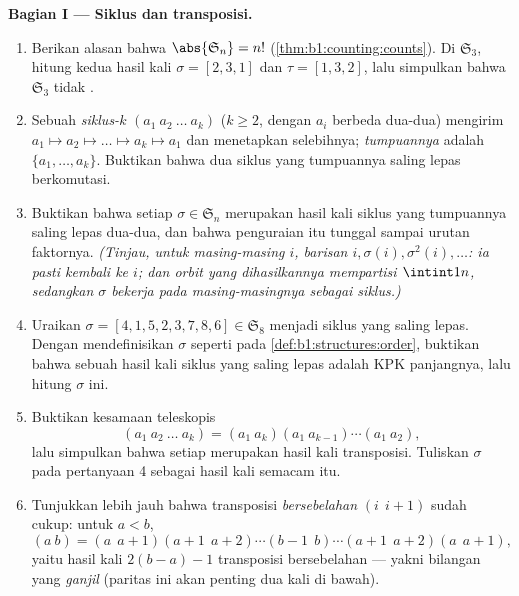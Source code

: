\begin{problem}
\medskip
\noindent\textbf{Bagian I --- Siklus dan transposisi.}
\begin{enumerate}
  \item Berikan alasan bahwa $\abs{\mathfrak S_n} = n!$
        (\cref{thm:b1:counting:counts}). Di $\mathfrak S_3$,
        hitung kedua hasil kali $\sigma = [2, 3, 1]$ dan $\tau =
        [1, 3, 2]$, lalu simpulkan bahwa $\mathfrak S_3$ tidak
        .
  \item Sebuah \emph{siklus-$k$} $(a_1\ a_2\ \dots\ a_k)$ ($k \geq 2$,
        dengan $a_i$ berbeda dua-dua) mengirim $a_1 \mapsto a_2
        \mapsto \dots \mapsto a_k \mapsto a_1$ dan menetapkan
        selebihnya; \emph{tumpuannya} adalah $\{a_1, \dots,
        a_k\}$. Buktikan bahwa dua siklus yang tumpuannya saling lepas
        berkomutasi.
  \item Buktikan bahwa setiap $\sigma \in \mathfrak S_n$ merupakan hasil kali
        siklus yang tumpuannya saling lepas dua-dua, dan bahwa
        penguraian itu tunggal sampai urutan faktornya.
        \emph{(Tinjau, untuk masing-masing $i$, barisan $i, \sigma(i),
        \sigma^2(i), \dots$: ia pasti kembali ke $i$; dan
        \emph{orbit} yang dihasilkannya mempartisi $\intint1n$, sedangkan $\sigma$ bekerja pada
        masing-masingnya sebagai siklus.)}
  \item Uraikan $\sigma = [4, 1, 5, 2, 3, 7, 8, 6] \in
        \mathfrak S_8$ menjadi siklus yang saling lepas. Dengan mendefinisikan
        \emph{} $\sigma$ seperti pada
        \cref{def:b1:structures:order}, buktikan bahwa  sebuah
        hasil kali siklus yang saling lepas adalah KPK panjangnya,
        lalu hitung  $\sigma$ ini.
  \item Buktikan kesamaan teleskopis
        \[
        (a_1\ a_2\ \dots\ a_k)
        = (a_1\ a_k)(a_1\ a_{k-1})\cdots(a_1\ a_2) ,
        \]
        lalu simpulkan bahwa setiap  merupakan hasil kali
        transposisi. Tuliskan $\sigma$ pada pertanyaan 4 sebagai hasil
        kali semacam itu.
  \item Tunjukkan lebih jauh bahwa transposisi \emph{bersebelahan}
        $(i\ \ i{+}1)$ sudah cukup: untuk $a < b$,
        \[
        (a\ b) = (a\ \ a{+}1)(a{+}1\ \ a{+}2)\cdots(b{-}1\ \ b)
        \cdots(a{+}1\ \ a{+}2)(a\ \ a{+}1),
        \]
        yaitu hasil kali $2(b - a) - 1$ transposisi bersebelahan ---
        yakni bilangan yang \emph{ganjil} (paritas ini akan penting dua kali
        di bawah).
\end{enumerate}


\end{problem}
